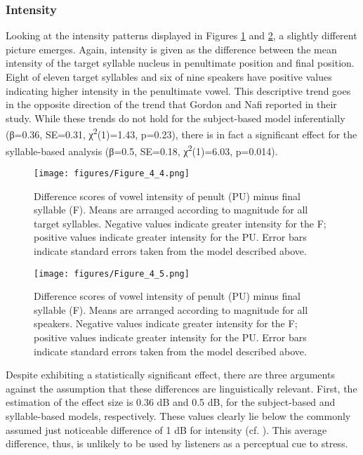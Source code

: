 \subsubsection{Intensity}
Looking at the intensity patterns displayed in Figures \ref{fig:4.4} and \ref{fig:4.5}, a slightly different picture emerges. Again, intensity is given as the difference between the mean intensity of the target syllable nucleus in penultimate position and final position. Eight of eleven target syllables and six of nine speakers have positive values indicating higher intensity in the penultimate vowel. This descriptive trend goes in the opposite direction of the trend that Gordon and Nafi reported in their study. While these trends do not hold for the subject-based model inferentially (β=0.36, SE=0.31, χ\textsuperscript{2}(1)=1.43, p=0.23), there is in fact a significant effect for the syllable-based analysis (β=0.5, SE=0.18, χ\textsuperscript{2}(1)=6.03, p=0.014). 

\begin{figure}
  \centering 
   \texttt{[image: figures/Figure\_4\_4.png]}
  \caption{Difference scores of vowel intensity of penult (PU) minus final syllable (F). Means are arranged according to magnitude for all target syllables. Negative values indicate greater intensity for the F; positive values indicate greater intensity for the PU. Error bars indicate standard errors taken from the model described above.}
   \label{fig:4.4}
   \end{figure}

\begin{figure}
  \centering 
   \texttt{[image: figures/Figure\_4\_5.png]}
  \caption{Difference scores of vowel intensity of penult (PU) minus final syllable (F). Means are arranged according to magnitude for all speakers. Negative values indicate greater intensity for the F; positive values indicate greater intensity for the PU. Error bars indicate standard errors taken from the model described above.}
   \label{fig:4.5}
   \end{figure}

Despite exhibiting a statistically significant effect, there are three arguments against the assumption that these differences are linguistically relevant. First, the estimation of the effect size is 0.36 dB and 0.5 dB, for the subject-based and syllable-based models, respectively. These values clearly lie below the commonly assumed just noticeable difference of 1 dB for intensity (cf. \citealt[119]{Lehiste1970}). This average difference, thus, is unlikely to be used by listeners as a perceptual cue to stress.

